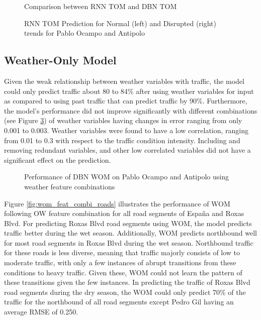 \begin{figure}[!t]
  \centering
  \captionsetup{justification=centering}
  \caption{Comparison between RNN TOM and DBN TOM}
  \label{fig:rnn_dbn_tom_pocampo}
\end{figure}

\begin{figure}[!t]
  \centering
  \captionsetup{justification=centering}
  \caption{RNN TOM Prediction for Normal (left) and Disrupted (right) trends for Pablo Ocampo and Antipolo}
  \label{fig:RNN_TOM_normal_disrption_pocampo_antipolo_wet}
\end{figure}


\subsection{Weather-Only Model}
Given the weak relationship between weather variables with traffic, the model could only predict traffic about 80 to 84\% after using weather variables for input as compared to using past traffic that can predict traffic by 90\%. Furthermore, the model’s performance did not improve significantly with different combinations (see Figure \ref{fig:wom_diff_feat_combi}) of weather variables having changes in error ranging from only 0.001 to 0.003. Weather variables were found to have a low correlation, ranging from 0.01 to 0.3 with respect to the traffic condition intensity. Including and removing redundant variables, and other low correlated variables did not have a significant effect on the prediction. 

\begin{figure}[!t]
  \centering
  \captionsetup{justification=centering}
  \caption{Performance of DBN WOM on Pablo Ocampo and Antipolo using weather feature combinations}
  \label{fig:wom_diff_feat_combi}
\end{figure}


Figure \ref{fig:wom_feat_combi_roads} illustrates the performance of WOM following OW feature combination for all road segments of España and Roxas Blvd. For predicting Roxas Blvd road segments using WOM, the model predicts traffic better during the wet season. Additionally, WOM predicts northbound well for most road segments in Roxas Blvd during the wet season. Northbound traffic for these roads is less diverse, meaning that traffic majorly consists of low to moderate traffic, with only a few instances of abrupt transitions from these conditions to heavy traffic. Given these, WOM could not learn the pattern of these transitions given the few instances. In predicting the traffic of Roxas Blvd road segments during the dry season, the WOM could only predict 70\% of the traffic for the northbound of all road segments except Pedro Gil having an average RMSE of 0.250. 

